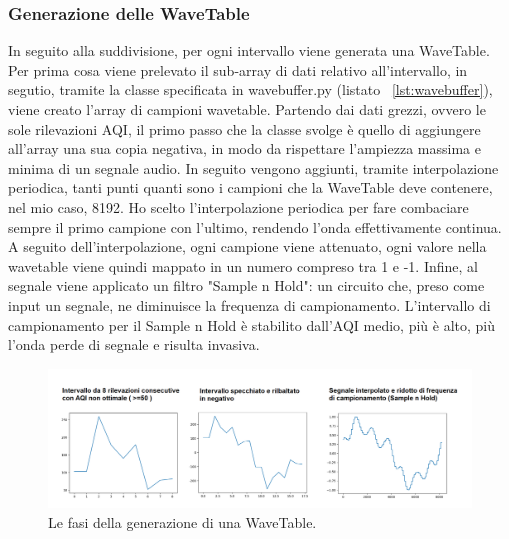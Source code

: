 \subsubsection{Generazione delle WaveTable}
In seguito alla suddivisione, per ogni intervallo viene generata una WaveTable.
Per prima cosa viene prelevato il sub-array di dati relativo all'intervallo, in segutio, tramite la classe specificata in wavebuffer.py (listato ~\ref{lst:wavebuffer}), viene creato l'array di campioni wavetable.
Partendo dai dati grezzi, ovvero le sole rilevazioni AQI, il primo passo che la classe svolge è quello di aggiungere all'array una sua copia negativa, in modo da rispettare l'ampiezza massima e minima di un segnale audio.
In seguito vengono aggiunti, tramite interpolazione periodica, tanti punti quanti sono i campioni che la WaveTable deve contenere, nel mio caso, 8192.
Ho scelto l'interpolazione periodica per fare combaciare sempre il primo campione con l'ultimo, rendendo l'onda effettivamente continua.
A seguito dell'interpolazione, ogni campione viene attenuato, ogni valore nella wavetable viene quindi mappato in un numero compreso tra 1 e -1.
Infine, al segnale viene applicato un filtro "Sample n Hold": un circuito che, preso come input un segnale, ne diminuisce la frequenza di campionamento.
L'intervallo di campionamento per il Sample n Hold è stabilito dall'AQI medio, più è alto, più l'onda perde di segnale e risulta invasiva.
\\
\begin{figure}[h]
  \includegraphics[width=\linewidth]{img/waves.png}
  \caption{Le fasi della generazione di una WaveTable.}
  \label{fig:wave_sub}
\end{figure}

\newpage

